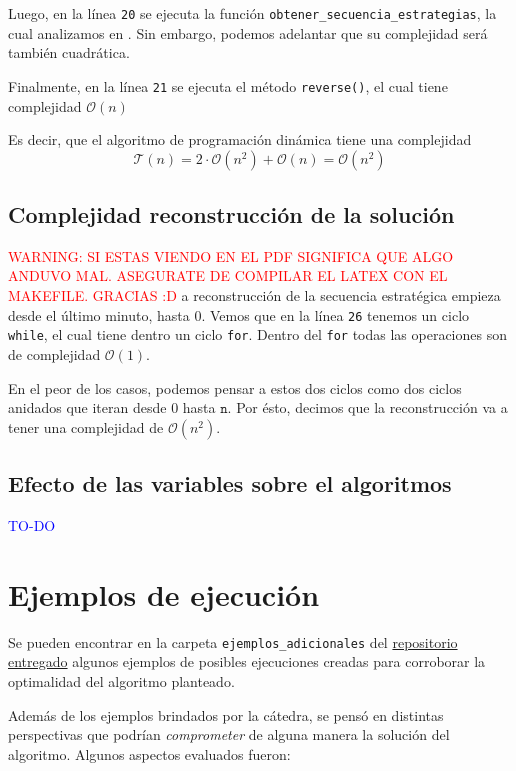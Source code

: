 \documentclass{article}
\newcommand{\funcionArchivo}[2]{%
  {\textcolor{red}{WARNING: SI ESTAS VIENDO EN EL PDF SIGNIFICA QUE ALGO ANDUVO MAL. ASEGURATE DE COMPILAR EL LATEX CON EL MAKEFILE. GRACIAS :D}}
  }%
\begin{document}
Luego, en la línea \texttt{20} se ejecuta la función \texttt{obtener\_secuencia\_estrategias}, la cual analizamos en . Sin embargo, podemos adelantar que su complejidad será también cuadrática.

Finalmente, en la línea \texttt{21} se ejecuta el método \texttt{reverse()}, el cual tiene complejidad $\mathcal{O}(n)$

Es decir, que el algoritmo de programación dinámica tiene una complejidad 
$$
\mathcal{T}(n) = 2 \cdot \mathcal{O}(n^2) + \mathcal{O}(n) = \mathcal{O}(n^2)
$$


\subsection{Complejidad reconstrucción de la solución}
\label{sec:reconstruccion}

\funcionArchivo{codigo/algoritmo.py obtener_secuencia_estrategias}
La reconstrucción de la secuencia estratégica empieza desde el último minuto, hasta 0.
Vemos que en la línea \texttt{26} tenemos un ciclo \texttt{while}, el cual tiene dentro un ciclo \texttt{for}.
Dentro del \texttt{for} todas las operaciones son de complejidad $\mathcal{O}(1)$.

En el peor de los casos, podemos pensar a estos dos ciclos como dos ciclos anidados que iteran desde 0 hasta $\texttt{n}$. Por ésto, decimos que la reconstrucción va a tener una complejidad de $\mathcal{O}(n^2)$.

\subsection{Efecto de las variables sobre el algoritmos}
\textcolor{blue}{TO-DO}

\section{Ejemplos de ejecución}
Se pueden encontrar en la carpeta \texttt{ejemplos\_adicionales} del \href{https://github.com/La-sociedad-del-silencio/TP2-Dinamica}{repositorio entregado} algunos ejemplos de posibles ejecuciones creadas para corroborar la optimalidad del algoritmo planteado.

Además de los ejemplos brindados por la cátedra, se pensó en distintas perspectivas que podrían \textit{comprometer} de alguna manera la solución del algoritmo. Algunos aspectos evaluados fueron:
\end{document}
